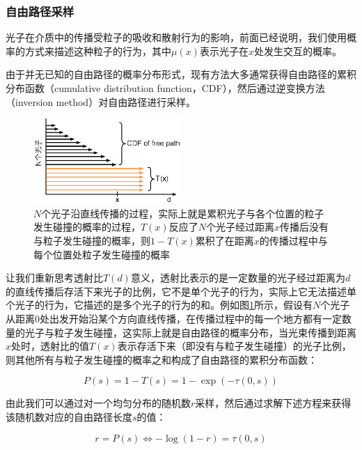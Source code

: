 \subsubsection{自由路径采样}
光子在介质中的传播受粒子的吸收和散射行为的影响，前面已经说明，我们使用概率的方式来描述这种粒子的行为，其中$\mu(x)$表示光子在$x$处发生交互的概率。

由于并无已知的自由路径的概率分布形式，现有方法大多通常获得自由路径的累积分布函数（cumulative distribution function，CDF），然后通过逆变换方法（inversion method）对自由路径进行采样。

\begin{figure}
	\sidecaption
	\includegraphics[width=0.5\textwidth]{figures/pm/free-path-cdf}
	\caption{$N$个光子沿直线传播的过程，实际上就是累积光子与各个位置的粒子发生碰撞的概率的过程，$T(x)$反应了$N$个光子经过距离$x$传播后没有与粒子发生碰撞的概率，则$1-T(x)$累积了在距离$x$的传播过程中与每个位置处粒子发生碰撞的概率}
	\label{f:pm-free-path-cdf}
\end{figure}

让我们重新思考透射比$T(d)$意义，透射比表示的是一定数量的光子经过距离为$d$的直线传播后存活下来光子的比例，它不是单个光子的行为，实际上它无法描述单个光子的行为，它描述的是多个光子的行为的和。例如图\ref{f:pm-free-path-cdf}所示，假设有$N$个光子从距离0处出发开始沿某个方向直线传播，在传播过程中的每一个地方都有一定数量的光子与粒子发生碰撞，这实际上就是自由路径的概率分布，当光束传播到距离$x$处时，透射比的值$T(x)$表示存活下来（即没有与粒子发生碰撞）的光子比例，则其他所有与粒子发生碰撞的概率之和构成了自由路径的累积分布函数：

\begin{equation}
	P(s)=1-T(s)=1-\exp(-\tau(0,s))
\end{equation}

由此我们可以通过对一个均匀分布的随机数$r$采样，然后通过求解下述方程来获得该随机数对应的自由路径长度$s$的值：

\begin{equation}\label{e:pm-free-path-random-number}
	r=P(s)\Leftrightarrow -\log(1-r)=\tau(0,s)
\end{equation}

